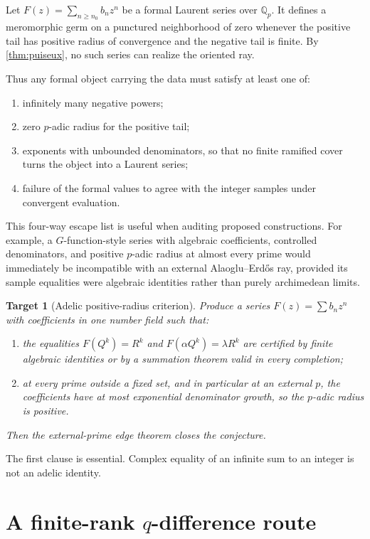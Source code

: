 \documentclass[11pt,oneside]{article}
\newtheorem{target}[theorem]{Target}
\theoremstyle{definition}
\newcommand{\Qp}{\mathbb Q_p}
\newcommand{\AEconj}{Alaoglu--Erd\H{o}s}
\begin{document}
Let $F(z)=\sum_{n\ge n_0}b_nz^n$ be a formal Laurent series over $\Qp$.  It defines a
meromorphic germ on a punctured neighborhood of zero whenever the positive tail has positive
radius of convergence and the negative tail is finite.  By \cref{thm:puiseux}, no such series
can realize the oriented ray.

Thus any formal object carrying the data must satisfy at least one of:
\begin{enumerate}
\item infinitely many negative powers;
\item zero $p$-adic radius for the positive tail;
\item exponents with unbounded denominators, so that no finite ramified cover turns the object
  into a Laurent series;
\item failure of the formal values to agree with the integer samples under convergent
  evaluation.
\end{enumerate}
This four-way escape list is useful when auditing proposed constructions.  For example, a
$G$-function-style series with algebraic coefficients, controlled denominators, and positive
$p$-adic radius at almost every prime would immediately be incompatible with an external
\AEconj{} ray, provided its sample equalities were algebraic identities rather than purely
archimedean limits.

\begin{target}[Adelic positive-radius criterion]\label{target:adelic-radius}
Produce a series $F(z)=\sum b_nz^n$ with coefficients in one number field such that:
\begin{enumerate}[label=(\roman*)]
\item the equalities $F(Q^k)=R^k$ and $F(\alpha Q^k)=\lambda R^k$ are certified by finite
  algebraic identities or by a summation theorem valid in every completion;
\item at every prime outside a fixed set, and in particular at an external $p$, the
  coefficients have at most exponential denominator growth, so the $p$-adic radius is
  positive.
\end{enumerate}
Then the external-prime edge theorem closes the conjecture.
\end{target}

The first clause is essential.  Complex equality of an infinite sum to an integer is not an
adelic identity.

\section{A finite-rank \texorpdfstring{$q$}{q}-difference route}
\label{sec:q-difference}
\end{document}
